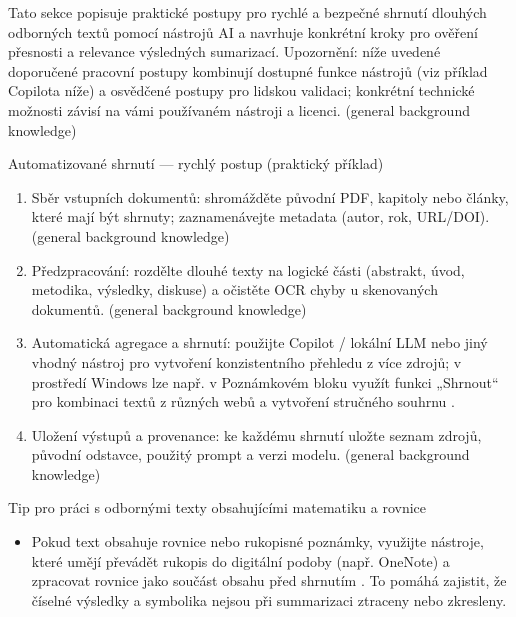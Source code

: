 Tato sekce popisuje praktické postupy pro rychlé a bezpečné shrnutí dlouhých odborných textů pomocí nástrojů AI a navrhuje konkrétní kroky pro ověření přesnosti a relevance výsledných sumarizací. Upozornění: níže uvedené doporučené pracovní postupy kombinují dostupné funkce nástrojů (viz příklad Copilota níže) a osvědčené postupy pro lidskou validaci; konkrétní technické možnosti závisí na vámi používaném nástroji a licenci. (general background knowledge)

Automatizované shrnutí — rychlý postup (praktický příklad)
\begin{enumerate}
  \item Sběr vstupních dokumentů: shromážděte původní PDF, kapitoly nebo články, které mají být shrnuty; zaznamenávejte metadata (autor, rok, URL/DOI). (general background knowledge)
  \item Předzpracování: rozdělte dlouhé texty na logické části (abstrakt, úvod, metodika, výsledky, diskuse) a očistěte OCR chyby u skenovaných dokumentů. (general background knowledge)
  \item Automatická agregace a shrnutí: použijte Copilot / lokální LLM nebo jiný vhodný nástroj pro vytvoření konzistentního přehledu z více zdrojů; v prostředí Windows lze např. v Poznámkovém bloku využít funkci „Shrnout“ pro kombinaci textů z různých webů a vytvoření stručného souhrnu \cite{kb_ai_101_tipu_pdf_04e4a115_page_14_1}.
  \item Uložení výstupů a provenance: ke každému shrnutí uložte seznam zdrojů, původní odstavce, použitý prompt a verzi modelu. (general background knowledge)
\end{enumerate}

Tip pro práci s odbornými texty obsahujícími matematiku a rovnice
\begin{itemize}
  \item Pokud text obsahuje rovnice nebo rukopisné poznámky, využijte nástroje, které umějí převádět rukopis do digitální podoby (např. OneNote) a zpracovat rovnice jako součást obsahu před shrnutím \cite{kb_ai_101_tipu_pdf_04e4a115_page_8_1}. To pomáhá zajistit, že číselné výsledky a symbolika nejsou při summarizaci ztraceny nebo zkresleny.
\end{itemize}

